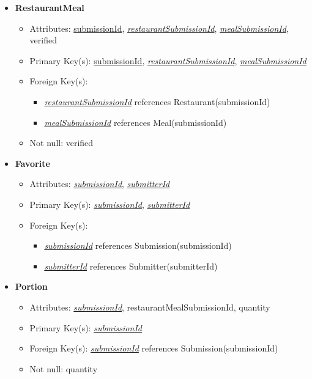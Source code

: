 \begin{itemize}
        \item \textbf{RestaurantMeal}
        \begin{itemize}
            \item Attributes: \underline{submissionId}, \underline{\textit{restaurantSubmissionId}}, \underline{\textit{mealSubmissionId}}, verified
            \item Primary Key(s): \underline{submissionId}, \underline{\textit{restaurantSubmissionId}}, \underline{\textit{mealSubmissionId}}
            \item Foreign Key(s): 
                \begin{itemize}
                    \item \underline{\textit{restaurantSubmissionId}} references Restaurant(submissionId)
                    \item \underline{\textit{mealSubmissionId}} references Meal(submissionId)
                \end{itemize}   
            \item Not null: verified
        \end{itemize}

        \item \textbf{Favorite}
        \begin{itemize}
            \item Attributes: \underline{\textit{submissionId}}, \underline{\textit{submitterId}}
            \item Primary Key(s): \underline{\textit{submissionId}}, \underline{\textit{submitterId}}
            \item Foreign Key(s): 
                \begin{itemize}
                    \item \underline{\textit{submissionId}} references Submission(submissionId)
                    \item \underline{\textit{submitterId}} references Submitter(submitterId)
                \end{itemize}
        \end{itemize}

        \item \textbf{Portion}
        \begin{itemize}
            \item Attributes: \underline{\textit{submissionId}}, restaurantMealSubmissionId, quantity
            \item Primary Key(s): \underline{\textit{submissionId}}
            \item Foreign Key(s): \underline{\textit{submissionId}} references Submission(submissionId)
            \item Not null: quantity
        \end{itemize}


\end{itemize}
